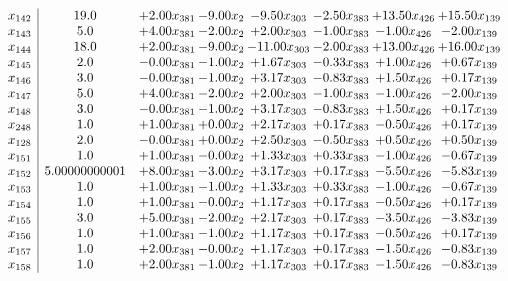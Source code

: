 \documentclass[8pt]{article}
\begin{document}
\[\begin{array}{c| c c@{\hskip 2pt} c@{\hskip 2pt} c@{\hskip 2pt} c@{\hskip 2pt} c@{\hskip 2pt} c@{\hskip 2pt} }
 x_{142}   &  19.0 & +  2.00 x_{381} & -9.00 x_{2} & -9.50 x_{303} & -2.50 x_{383} & + 13.50 x_{426} & + 15.50 x_{139}\\
 x_{143}   &  5.0 & +  4.00 x_{381} & -2.00 x_{2} & +  2.00 x_{303} & -1.00 x_{383} & -1.00 x_{426} & -2.00 x_{139}\\
 x_{144}   &  18.0 & +  2.00 x_{381} & -9.00 x_{2} & -11.00 x_{303} & -2.00 x_{383} & + 13.00 x_{426} & + 16.00 x_{139}\\
 x_{145}   &  2.0 & -0.00 x_{381} & -1.00 x_{2} & +  1.67 x_{303} & -0.33 x_{383} & +  1.00 x_{426} & +  0.67 x_{139}\\
 x_{146}   &  3.0 & -0.00 x_{381} & -1.00 x_{2} & +  3.17 x_{303} & -0.83 x_{383} & +  1.50 x_{426} & +  0.17 x_{139}\\
 x_{147}   &  5.0 & +  4.00 x_{381} & -2.00 x_{2} & +  2.00 x_{303} & -1.00 x_{383} & -1.00 x_{426} & -2.00 x_{139}\\
 x_{148}   &  3.0 & -0.00 x_{381} & -1.00 x_{2} & +  3.17 x_{303} & -0.83 x_{383} & +  1.50 x_{426} & +  0.17 x_{139}\\
 x_{248}   &  1.0 & +  1.00 x_{381} & +  0.00 x_{2} & +  2.17 x_{303} & +  0.17 x_{383} & -0.50 x_{426} & +  0.17 x_{139}\\
 x_{128}   &  2.0 & -0.00 x_{381} & +  0.00 x_{2} & +  2.50 x_{303} & -0.50 x_{383} & +  0.50 x_{426} & +  0.50 x_{139}\\
 x_{151}   &  1.0 & +  1.00 x_{381} & -0.00 x_{2} & +  1.33 x_{303} & +  0.33 x_{383} & -1.00 x_{426} & -0.67 x_{139}\\
 x_{152}   &  5.00000000001 & +  8.00 x_{381} & -3.00 x_{2} & +  3.17 x_{303} & +  0.17 x_{383} & -5.50 x_{426} & -5.83 x_{139}\\
 x_{153}   &  1.0 & +  1.00 x_{381} & -1.00 x_{2} & +  1.33 x_{303} & +  0.33 x_{383} & -1.00 x_{426} & -0.67 x_{139}\\
 x_{154}   &  1.0 & +  1.00 x_{381} & -0.00 x_{2} & +  1.17 x_{303} & +  0.17 x_{383} & -0.50 x_{426} & +  0.17 x_{139}\\
 x_{155}   &  3.0 & +  5.00 x_{381} & -2.00 x_{2} & +  2.17 x_{303} & +  0.17 x_{383} & -3.50 x_{426} & -3.83 x_{139}\\
 x_{156}   &  1.0 & +  1.00 x_{381} & -1.00 x_{2} & +  1.17 x_{303} & +  0.17 x_{383} & -0.50 x_{426} & +  0.17 x_{139}\\
 x_{157}   &  1.0 & +  2.00 x_{381} & -0.00 x_{2} & +  1.17 x_{303} & +  0.17 x_{383} & -1.50 x_{426} & -0.83 x_{139}\\
 x_{158}   &  1.0 & +  2.00 x_{381} & -1.00 x_{2} & +  1.17 x_{303} & +  0.17 x_{383} & -1.50 x_{426} & -0.83 x_{139}\\

\end{array}\]
\end{document}
